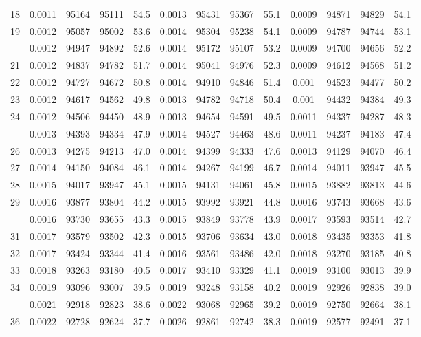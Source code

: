 \documentclass[
  14pt,
]{article}
\begin{document}
\begin{longtable}[t]{lcccccccccccc}
18 & 0.0011 & 95164 & 95111 & 54.5 & 0.0013 & 95431 & 95367 & 55.1 & 0.0009 & 94871 & 94829 & 54.1\\
19 & 0.0012 & 95057 & 95002 & 53.6 & 0.0014 & 95304 & 95238 & 54.1 & 0.0009 & 94787 & 94744 & 53.1\\
\addlinespace
20 & 0.0012 & 94947 & 94892 & 52.6 & 0.0014 & 95172 & 95107 & 53.2 & 0.0009 & 94700 & 94656 & 52.2\\
21 & 0.0012 & 94837 & 94782 & 51.7 & 0.0014 & 95041 & 94976 & 52.3 & 0.0009 & 94612 & 94568 & 51.2\\
22 & 0.0012 & 94727 & 94672 & 50.8 & 0.0014 & 94910 & 94846 & 51.4 & 0.001 & 94523 & 94477 & 50.2\\
23 & 0.0012 & 94617 & 94562 & 49.8 & 0.0013 & 94782 & 94718 & 50.4 & 0.001 & 94432 & 94384 & 49.3\\
24 & 0.0012 & 94506 & 94450 & 48.9 & 0.0013 & 94654 & 94591 & 49.5 & 0.0011 & 94337 & 94287 & 48.3\\
\addlinespace
25 & 0.0013 & 94393 & 94334 & 47.9 & 0.0014 & 94527 & 94463 & 48.6 & 0.0011 & 94237 & 94183 & 47.4\\
26 & 0.0013 & 94275 & 94213 & 47.0 & 0.0014 & 94399 & 94333 & 47.6 & 0.0013 & 94129 & 94070 & 46.4\\
27 & 0.0014 & 94150 & 94084 & 46.1 & 0.0014 & 94267 & 94199 & 46.7 & 0.0014 & 94011 & 93947 & 45.5\\
28 & 0.0015 & 94017 & 93947 & 45.1 & 0.0015 & 94131 & 94061 & 45.8 & 0.0015 & 93882 & 93813 & 44.6\\
29 & 0.0016 & 93877 & 93804 & 44.2 & 0.0015 & 93992 & 93921 & 44.8 & 0.0016 & 93743 & 93668 & 43.6\\
\addlinespace
30 & 0.0016 & 93730 & 93655 & 43.3 & 0.0015 & 93849 & 93778 & 43.9 & 0.0017 & 93593 & 93514 & 42.7\\
31 & 0.0017 & 93579 & 93502 & 42.3 & 0.0015 & 93706 & 93634 & 43.0 & 0.0018 & 93435 & 93353 & 41.8\\
32 & 0.0017 & 93424 & 93344 & 41.4 & 0.0016 & 93561 & 93486 & 42.0 & 0.0018 & 93270 & 93185 & 40.8\\
33 & 0.0018 & 93263 & 93180 & 40.5 & 0.0017 & 93410 & 93329 & 41.1 & 0.0019 & 93100 & 93013 & 39.9\\
34 & 0.0019 & 93096 & 93007 & 39.5 & 0.0019 & 93248 & 93158 & 40.2 & 0.0019 & 92926 & 92838 & 39.0\\
\addlinespace
35 & 0.0021 & 92918 & 92823 & 38.6 & 0.0022 & 93068 & 92965 & 39.2 & 0.0019 & 92750 & 92664 & 38.1\\
36 & 0.0022 & 92728 & 92624 & 37.7 & 0.0026 & 92861 & 92742 & 38.3 & 0.0019 & 92577 & 92491 & 37.1\\

\end{longtable}
\end{document}

